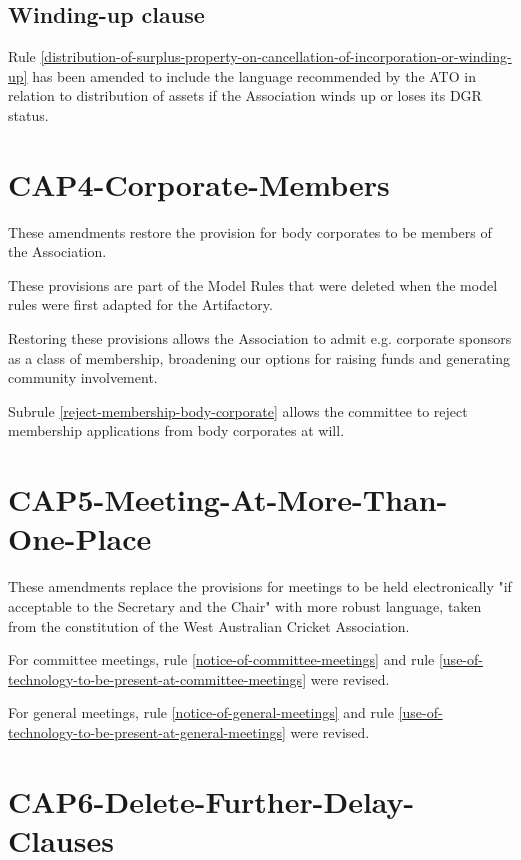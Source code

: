 \documentclass[../constitution.tex]{subfiles}
\begin{document}

\subsection*{Winding-up clause}

Rule \ref{distribution-of-surplus-property-on-cancellation-of-incorporation-or-winding-up} has been amended to include the language recommended by the ATO in relation to distribution of assets if the Association winds up or loses its DGR status.


\section*{CAP4-Corporate-Members}

These amendments restore the provision for body corporates to be members of the Association.

These provisions are part of the Model Rules that were deleted when the model rules were first adapted for the Artifactory.

Restoring these provisions allows the Association to admit e.g. corporate sponsors as a class of membership, broadening our options for raising funds and generating community involvement.

Subrule \ref{reject-membership-body-corporate} allows the committee to reject membership applications from body corporates at will.

\section*{CAP5-Meeting-At-More-Than-One-Place}

These amendments replace the provisions for meetings to be held electronically "if acceptable to the Secretary and the Chair" with more robust language, taken from the constitution of the West Australian Cricket Association.

For committee meetings, rule \ref{notice-of-committee-meetings} and rule \ref{use-of-technology-to-be-present-at-committee-meetings} were revised.

For general meetings, rule \ref{notice-of-general-meetings} and rule \ref{use-of-technology-to-be-present-at-general-meetings} were revised.

\section*{CAP6-Delete-Further-Delay-Clauses}
\end{document}
